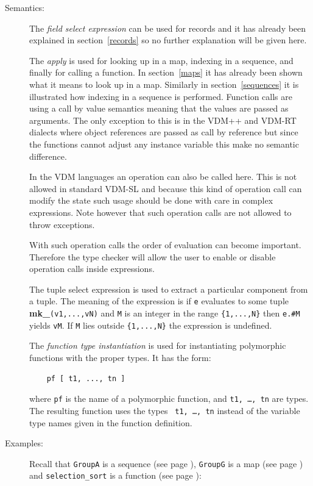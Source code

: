 \documentclass{overturerepchap}
\newcommand{\keyw}[1]{{\bf\ttfamily #1}}
\begin{document}
{\begin{description}
\item[Semantics:] The {\it field select expression} can be used for records
  and it has already been explained in section~\ref{records} so no further
  explanation will be given here.

  The {\it apply} is used for looking up in a map, indexing in a
  sequence, and finally for calling a function. In section~\ref{maps} it
  has already been shown what it means to look up in a map. Similarly in
  section~\ref{sequences} it is illustrated how indexing in a sequence is
  performed. Function calls are using a call by value semantics meaning that the values are passed as arguments. The only exception to this is in the VDM++ and VDM-RT dialects where object references are passed as call by reference but since the functions cannot adjust any instance variable this make no semantic difference.

  In the VDM languages an operation can also be called
  here. This is not allowed in standard VDM-SL and because this kind of
  operation call can modify the state such usage should be done with
  care in complex expressions. Note however that such operation calls
  are not allowed to throw exceptions.

  With such operation calls the order of evaluation can become
  important. Therefore the type checker will allow the user to enable
  or disable operation calls inside expressions.

  The tuple select expression is used to extract a particular
  component from a tuple. The meaning of the expression is if
  \texttt{e} evaluates to some tuple
  \keyw{mk\_}\texttt{(v1,...,vN)} and \texttt{M} is an integer in the
  range \verb+{1,...,N}+ then \texttt{e.\#M} yields \texttt{vM}. If
  \texttt{M} lies outside \verb+{1,...,N}+ the expression is undefined.

  The {\it function type instantiation\/} is used for instantiating
  polymorphic functions with the proper types. It has the form:
  \begin{lstlisting}
    pf [ t1, ..., tn ]
  \end{lstlisting}
  where {\tt pf} is the name of a polymorphic function, and {\tt t1,
    \ldots, tn} are types. The resulting function uses the types {\tt
    t1, \ldots, tn} instead of the variable type names given in the
  function definition.

\item[Examples:] Recall that \texttt{GroupA} is a sequence (see page
  \pageref{GroupAdef}), \texttt{GroupG} is a map (see page \pageref{GroupGdef})
  and \texttt{selection\_sort} is a function (see page \pageref{selectionSortdef}):


\end{description}}
\end{document}
